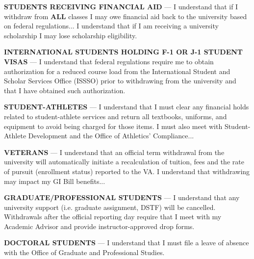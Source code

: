 \documentclass[12pt]{article}
\begin{document}
{%
\noindent\underline{\hspace{1.5em}} \textbf{STUDENTS RECEIVING FINANCIAL AID} — I understand that if I withdraw from \textbf{ALL} classes I may owe financial aid back to the university based on federal regulations... I understand that if I am receiving a university scholarship I may lose scholarship eligibility.
\vspace{1em}
{%

{%
\noindent\underline{\hspace{1.5em}} \textbf{INTERNATIONAL STUDENTS HOLDING F-1 OR J-1 STUDENT VISAS} — I understand that federal regulations require me to obtain authorization for a reduced course load from the International Student and Scholar Services Office (ISSSO) prior to withdrawing from the university and that I have obtained such authorization.
\vspace{1em}
{%

{%
\noindent\underline{\hspace{1.5em}} \textbf{STUDENT-ATHLETES} — I understand that I must clear any financial holds related to student-athlete services and return all textbooks, uniforms, and equipment to avoid being charged for those items. I must also meet with Student-Athlete Development and the Office of Athletics’ Compliance...
\vspace{1em}
{%

{%
\noindent\underline{\hspace{1.5em}} \textbf{VETERANS} — I understand that an official term withdrawal from the university will automatically initiate a recalculation of tuition, fees and the rate of pursuit (enrollment status) reported to the VA. I understand that withdrawing may impact my GI Bill benefits...
\vspace{1em}
{%

{%
\noindent\underline{\hspace{1.5em}} \textbf{GRADUATE/PROFESSIONAL STUDENTS} — I understand that any university support (i.e. graduate assignment, DSTF) will be cancelled. Withdrawals after the official reporting day require that I meet with my Academic Advisor and provide instructor-approved drop forms.
\vspace{1em}
{%

{%
\noindent\underline{\hspace{1.5em}} \textbf{DOCTORAL STUDENTS} — I understand that I must file a leave of absence with the Office of Graduate and Professional Studies.
\vspace{1em}
{%

}}}}}}}}}}}}
\end{document}
